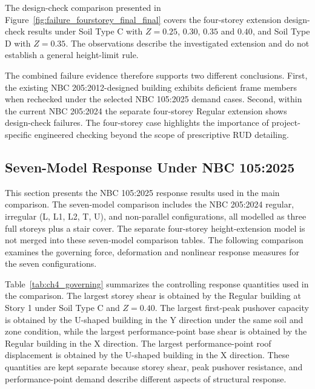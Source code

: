 The design-check comparison presented in Figure~\ref{fig:failure_fourstorey_final_final} covers the four-storey extension design-check results under Soil Type C with $Z=0.25$, $0.30$, $0.35$ and $0.40$, and Soil Type D with $Z=0.35$. The observations describe the investigated extension and do not establish a general height-limit rule.

The combined failure evidence therefore supports two different conclusions. First, the existing NBC 205:2012-designed building exhibits deficient frame members when rechecked under the selected NBC 105:2025 demand cases. Second, within the current NBC 205:2024 the separate four-storey Regular extension shows design-\allowbreak{}check failures. The four-storey case highlights the importance of project-specific engineered checking beyond the scope of prescriptive RUD detailing.



\clearpage
\subsection{Seven-Model Response Under NBC 105:2025}
This section presents the NBC 105:2025 response results used in the main comparison. The seven-model comparison includes the NBC 205:2024 regular, irregular (L, L1, L2, T, U), and non-parallel configurations, all modelled as three full storeys plus a stair cover. The separate four-storey height-extension model is not merged into these seven-model comparison tables. The following comparison examines the governing force, deformation and nonlinear response measures for the seven configurations.

Table~\ref{tab:ch4_governing} summarizes the controlling response quantities used in the comparison. The largest storey shear is obtained by the Regular building at Story 1 under Soil Type C and $Z=0.40$. The largest first-peak pushover capacity is obtained by the U-shaped building in the Y direction under the same soil and zone condition, while the largest performance-\allowbreak{}point base shear is obtained by the Regular building in the X direction. The largest performance-\allowbreak{}point roof displacement is obtained by the U-shaped building in the X direction. These quantities are kept separate because storey shear, peak pushover resistance, and performance-\allowbreak{}point demand describe different aspects of structural response.

